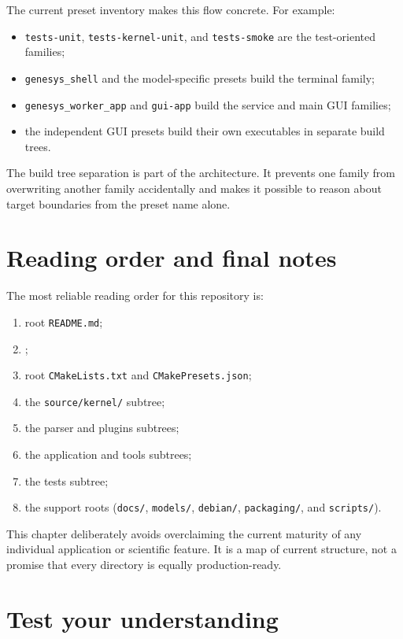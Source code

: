 The current preset inventory makes this flow concrete. For example:
\begin{itemize}
\item \texttt{tests-unit}, \texttt{tests-kernel-unit}, and
\texttt{tests-smoke} are the test-oriented families;
\item \texttt{genesys\_shell} and the model-specific presets build the terminal
family;
\item \texttt{genesys\_worker\_app} and \texttt{gui-app} build the service and
main GUI families;
\item the independent GUI presets build their own executables in separate build
trees.
\end{itemize}

The build tree separation is part of the architecture. It prevents one family
from overwriting another family accidentally and makes it possible to reason
about target boundaries from the preset name alone.

\section{Reading order and final notes}
\label{sec:repo-reading-order}

The most reliable reading order for this repository is:
\begin{enumerate}
\item root \texttt{README.md};
\item {};
\item root \texttt{CMakeLists.txt} and \texttt{CMakePresets.json};
\item the \texttt{source/kernel/} subtree;
\item the parser and plugins subtrees;
\item the application and tools subtrees;
\item the tests subtree;
\item the support roots (\texttt{docs/}, \texttt{models/}, \texttt{debian/},
\texttt{packaging/}, and \texttt{scripts/}).
\end{enumerate}

This chapter deliberately avoids overclaiming the current maturity of any
individual application or scientific feature. It is a map of current structure,
not a promise that every directory is equally production-ready.

\section{Test your understanding}
\label{sec:repo-test-your-understanding}

